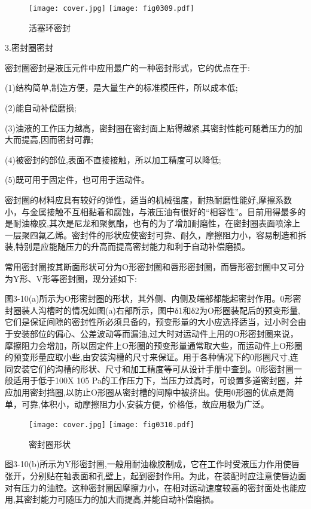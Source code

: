 \begin{figure}
\centering
\ifOpenSource
\texttt{[image: cover.jpg]}
\else
\texttt{[image: fig0309.pdf]}
\fi
\caption{活塞环密封}
\label{fig:fig0309}
\end{figure}

\indent 3.密封圈密封

\indent 密封圈密封是液压元件中应用最广的一种密封形式，它的优点在于:

\indent (1)结构简单,制造方便，是大量生产的标准模压件，所以成本低;

\indent (2)能自动补偿磨损;

\indent (3)油液的工作压力越高，密封圈在密封面上贴得越紧,其密封性能可随着压力的加大而提高,因而密封可靠;

\indent (4)被密封的部位,表面不直接接触，所以加工精度可以降低;

\indent (5)既可用于固定件，也可用于运动件。

\indent 密封圈的材料应具有较好的弹性，适当的机械强度，耐热耐磨性能好,摩擦系数小，与金属接触不互相黏着和腐蚀，与液压油有很好的“相容性”。目前用得最多的是耐油橡胶,其次是尼龙和聚氨酯，也有的为了增加耐磨性，在密封圈表面喷涂上一层聚四氟乙烯。密封件的形状应使密封可靠、耐久，摩擦阻力小，容易制造和拆装,特别是应能随压力的升高而提高密封能力和利于自动补偿磨损。

\indent 常用密封圈按其断面形状可分为O形密封圈和唇形密封圈，而唇形密封圈中又可分为Y形、V形等密封圈，现分述如下:

\indent 图3-10(a)所示为O形密封圈的形状，其外侧、内侧及端部都能起密封作用。0形密封圈装人沟槽时的情况如图(a)右部所示，图中δ1和δ2为O形圈装配后的预变形量,它们是保证间隙的密封性所必须具备的，预变形量的大小应选择适当，过小时会由于安装部位的偏心、公差波动等而漏油,过大时对运动件上用的O形密封圈来说，摩擦阻力会增加，所以固定件上O形圈的预变形量通常取大些，而运动件上O形圈的预变形量应取小些,由安装沟槽的尺寸来保证。用于各种情况下的0形圈尺寸,连同安装它们的沟槽的形状、尺寸和加工精度等可从设计手册中查到。0形密封圈一般适用于低于100X 105 Pa的工作压力下，当压力过高时，可设置多道密封圈，并应加用密封挡圈,以防止O形圈从密封槽的间隙中被挤出。使用0形圈的优点是简单，可靠,体积小，动摩擦阻力小,安装方便，价格低，故应用极为广泛。

\begin{figure}
\centering
\ifOpenSource
\texttt{[image: cover.jpg]}
\else
\texttt{[image: fig0310.pdf]}
\fi
\caption{密封圈形状}
\label{fig:fig0310}
\end{figure}

\indent 图3-10(b)所示为Y形密封圈,一般用耐油橡胶制成，它在工作时受液压力作用使唇张开，分别贴在轴表面和孔壁上，起到密封作用。为此，在装配时应注意使唇边面对有压力的油腔。这种密封圈因摩擦力小，在相对运动速度较高的密封面处也能应用,其密封能力可随压力的加大而提高,并能自动补偿磨损。

